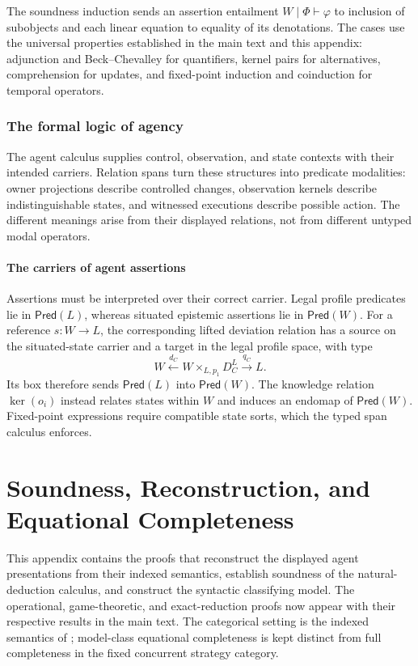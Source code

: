 \documentclass[11pt,a4paper]{article}
\numberwithin{equation}{section}
\theoremstyle{definition}
\theoremstyle{remark}
\theoremstyle{plain}
\begin{document}
The soundness induction sends an assertion entailment
$W\mid\Phi\vdash\varphi$ to inclusion of subobjects and each
linear equation to equality of its denotations. The cases use the
universal properties established in the main text and this appendix:
adjunction and Beck--Chevalley for quantifiers, kernel pairs for
alternatives, comprehension for updates, and fixed-point
induction and coinduction for temporal operators.

\subsubsection{The formal logic of agency}
\label{sec:egt-logic}

The agent calculus supplies control, observation, and state
contexts with their intended carriers. Relation spans turn these
structures into predicate modalities: owner projections describe
controlled changes, observation kernels describe indistinguishable
states, and witnessed executions describe possible action. The
different meanings arise from their displayed relations, not from
different untyped modal operators.

\paragraph{The carriers of agent assertions}

Assertions must be interpreted over their correct carrier. Legal
profile predicates lie in $\mathsf{Pred}(L)$, whereas situated
epistemic assertions lie in $\mathsf{Pred}(W)$. For a reference
$s:W\to L$, the corresponding lifted deviation relation has a
source on the situated-state carrier and a target in the legal profile
space, with type
\[
 W\xleftarrow{d_C}W\times_{L,p_1}D_C^L
       \xrightarrow{q_C}L.
\]
Its box therefore sends $\mathsf{Pred}(L)$ into
$\mathsf{Pred}(W)$. The knowledge relation $\ker(o_i)$ instead
relates states within $W$ and induces an endomap of
$\mathsf{Pred}(W)$. Fixed-point expressions require compatible state
sorts, which the typed span calculus enforces.


\clearpage
\section{Soundness, Reconstruction, and Equational Completeness}
\label{app:metatheory}

This appendix contains the proofs that reconstruct the displayed agent
presentations from their indexed semantics, establish soundness of the
natural-deduction calculus, and construct the syntactic classifying model.
The operational, game-theoretic, and exact-reduction proofs now appear
with their respective results in the main text. The categorical setting
is the indexed semantics of \citet{Jacobs1999,Vakar2015LinearFrameworks};
model-class equational completeness is kept distinct from full
completeness in the fixed concurrent strategy category.
\end{document}
